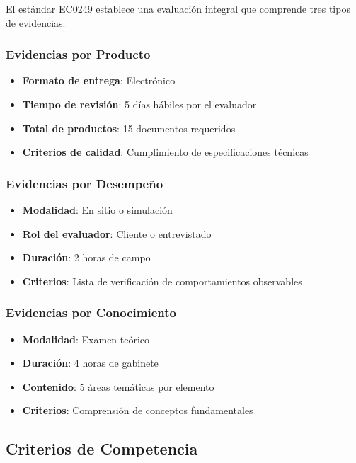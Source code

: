 \documentclass[12pt,letterpaper,oneside]{book}
\begin{document}
El estándar EC0249 establece una evaluación integral que comprende tres tipos de evidencias:

\subsubsection{Evidencias por Producto}

\begin{itemize}
\item \textbf{Formato de entrega}: Electrónico
\item \textbf{Tiempo de revisión}: 5 días hábiles por el evaluador
\item \textbf{Total de productos}: 15 documentos requeridos
\item \textbf{Criterios de calidad}: Cumplimiento de especificaciones técnicas
\end{itemize}

\subsubsection{Evidencias por Desempeño}

\begin{itemize}
\item \textbf{Modalidad}: En sitio o simulación
\item \textbf{Rol del evaluador}: Cliente o entrevistado
\item \textbf{Duración}: 2 horas de campo
\item \textbf{Criterios}: Lista de verificación de comportamientos observables
\end{itemize}

\subsubsection{Evidencias por Conocimiento}

\begin{itemize}
\item \textbf{Modalidad}: Examen teórico
\item \textbf{Duración}: 4 horas de gabinete
\item \textbf{Contenido}: 5 áreas temáticas por elemento
\item \textbf{Criterios}: Comprensión de conceptos fundamentales
\end{itemize}

\subsection{Criterios de Competencia}
\end{document}
